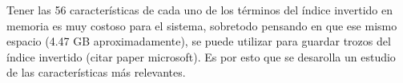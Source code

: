 Tener las 56 características de cada uno de los términos del índice invertido en memoria es muy costoso para el sistema, sobretodo pensando en que ese mismo espacio (4.47 GB aproximadamente), se puede utilizar para guardar trozos del índice invertido (citar paper microsoft). Es por esto que se desarolla un estudio de las características más relevantes.

 






